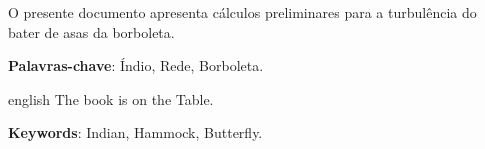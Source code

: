 \documentclass[12pt,openright,oneside,a4paper,english,brazil,oficial]{iaeRT}
\begin{document}
\def\NumCopias{3} %
\def\Copiai{DIV1}
\def	\Copiaii{DIV2}

\def\PalavrasChave{Índio, Rede, Borboleta}

\def\Keywords{Indian, Hammock, Butterfly}

\def\PalavrasChaveIndexacao{Índio, Rede, Borboleta}

\def\ArquivoEletronico{123-000000-X0010.pdf}

\def\CodSIGTEC{}

\def\Observacoes{}

\def\Resumo{O presente documento apresenta cálculos preliminares para a turbulência do bater de asas da borboleta.}

\def\Abstract{The book is on the Table.}

\def\Projeto{BRB01}
\def\InicioCodigo{123} 
\def\nivelSuperior{Não há}
\def\nivelInferior{Não há}



\frenchspacing 

\imprimircapa
\setcounter{page}{1}
\imprimirfolhaidentificacao
\imprimirfolhafluxo

\setlength{\absparsep}{18pt} %
\begin{resumo}[Resumo]
 \Resumo

 \textbf{Palavras-chave}: \PalavrasChave.
\end{resumo}%
\begin{resumo}[Abstract]
 \begin{otherlanguage*}{english}
   \Abstract
 
   \noindent 
   \textbf{Keywords}: \Keywords.
 \end{otherlanguage*}
\end{resumo}\newpage
\listoffigures*
\cleardoublepage
\end{document}
